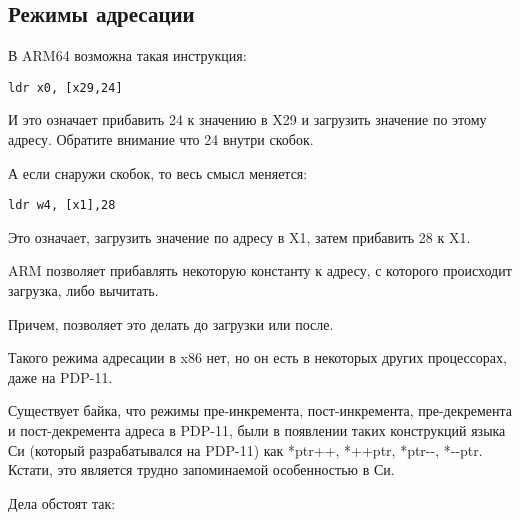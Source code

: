 ﻿\subsection{Режимы адресации}
\label{ARM_postindex_vs_preindex}
\myindex{\CLanguageElements!\PostIncrement}
\myindex{\CLanguageElements!\PostDecrement}
\myindex{\CLanguageElements!\PreIncrement}
\myindex{\CLanguageElements!\PreDecrement}

В ARM64 возможна такая инструкция:

\begin{lstlisting}
ldr	x0, [x29,24]
\end{lstlisting}

И это означает прибавить 24 к значению в X29 и загрузить значение по этому адресу.
Обратите внимание что 24 внутри скобок.

А если снаружи скобок, то весь смысл меняется:

\begin{lstlisting}
ldr	w4, [x1],28
\end{lstlisting}

Это означает, загрузить значение по адресу в X1, затем прибавить 28 к X1.

ARM позволяет прибавлять некоторую константу к адресу, с которого происходит загрузка, либо вычитать.

Причем, позволяет это делать до загрузки или после.

Такого режима адресации в x86 нет, но он есть в некоторых других процессорах, даже на PDP-11.

Существует байка, что режимы пре-инкремента, пост-инкремента, 
пре-декремента и пост-декремента адреса в PDP-11,
были  в появлении таких конструкций языка Си (который разрабатывался на PDP-11) как
*ptr++, *++ptr, *ptr-{}-, *-{}-ptr. 
Кстати, это является трудно запоминаемой особенностью в Си.

Дела обстоят так:

